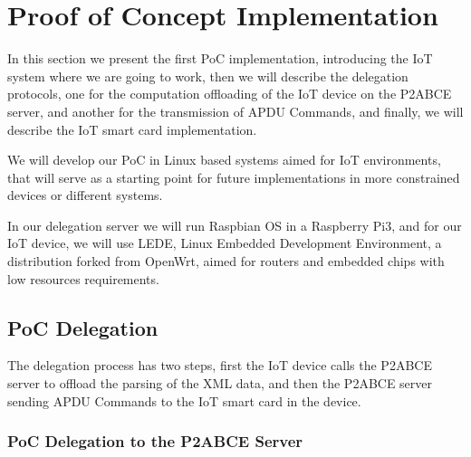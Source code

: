 

\section{Proof of Concept Implementation}\label{ch:implementation}
%
%  


In this section we present the first PoC implementation, introducing the IoT system where we are going to work, then we will describe the delegation protocols, one for the computation offloading of the IoT device on the P2ABCE server, and another for the transmission of APDU Commands, and finally, we will describe the IoT smart card implementation.

We will develop our PoC in Linux based systems aimed for IoT environments, that will serve as a starting point for future implementations in more constrained devices or different systems.

In our delegation server we will run Raspbian OS in a Raspberry Pi3, and for our IoT device, we will use LEDE, Linux Embedded Development Environment, a distribution forked from OpenWrt, aimed for routers and embedded chips with low resources requirements.



\subsection{PoC Delegation}

The delegation process has two steps, first the IoT device calls the P2ABCE server to offload the parsing of the XML data, and then the P2ABCE server sending APDU Commands to the IoT smart card in the device.


\subsubsection{PoC Delegation to the P2ABCE Server}


